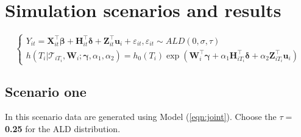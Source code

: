 \documentclass{article}
\begin{document}
\section{Simulation scenarios and results}

\begin{equation}\label{eqn:joint}
\left\{
\begin{array}{l}
Y_{it} = {\boldsymbol X}_{it}^{\top}\boldsymbol{\beta} + {\boldsymbol H}_{it}^{\top}\boldsymbol{\delta} + {\boldsymbol Z}_{it}^{\top}{\boldsymbol u}_i + \varepsilon_{it}, \varepsilon_{it}\sim ALD(0, \sigma,\tau)\\
h(T_i|\mathcal{T}_{iT_i}, {\boldsymbol W}_i;  \boldsymbol{\gamma}, \alpha_1,
\alpha_2) = h_0(T_i)\exp({\boldsymbol W}_i^{\top}\boldsymbol{\gamma} + \alpha_1{\boldsymbol H}_{iT_i}^{\top}\boldsymbol{\delta} + \alpha_2{\boldsymbol Z}_{iT_i}^{\top}{\boldsymbol u}_{i})
\end{array}
\right.
\end{equation}


\subsection{Scenario one}
In this scenario data are generated using Model (\ref{eqn:joint}). Choose the $\tau=$ {\bf 0.25} for the ALD distribution.
\end{document}
